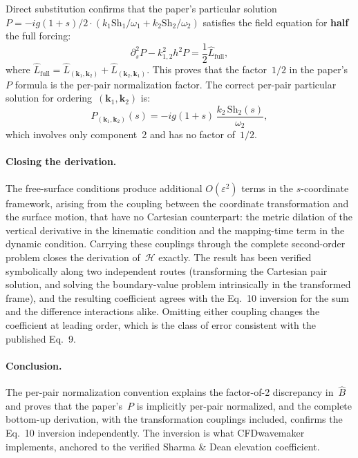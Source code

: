 \documentclass{ol-softwaremanual}
\begin{document}
Direct substitution confirms that the paper's particular solution $P = -ig(1+s)/2\cdot(k_1\mathrm{Sh}_1/\omega_1 + k_2\mathrm{Sh}_2/\omega_2)$ satisfies the field equation for \textbf{half} the full forcing:
\begin{equation}
\partial_s^2 P - k_{1,2}^2 h^2 P = \frac{1}{2}\hat{L}_\mathrm{full},
\end{equation}
where $\hat{L}_\mathrm{full} = \hat{L}_{(\mathbf{k}_1,\mathbf{k}_2)} + \hat{L}_{(\mathbf{k}_2,\mathbf{k}_1)}$. This proves that the factor~$1/2$ in the paper's~$P$ formula is the per-pair normalization factor. The correct per-pair particular solution for ordering~$(\mathbf{k}_1,\mathbf{k}_2)$ is:
\begin{equation}
P_{(\mathbf{k}_1,\mathbf{k}_2)}(s) = -ig(1+s)\,\frac{k_2\,\mathrm{Sh}_2(s)}{\omega_2},
\end{equation}
which involves only component~2 and has no factor of~$1/2$.

\paragraph{Closing the derivation.} The free-surface conditions produce additional $O(\varepsilon^2)$ terms in the $s$-coordinate framework, arising from the coupling between the coordinate transformation and the surface motion, that have no Cartesian counterpart: the metric dilation of the vertical derivative in the kinematic condition and the mapping-time term in the dynamic condition. Carrying these couplings through the complete second-order problem closes the derivation of~$\mathscr{H}$ exactly. The result has been verified symbolically along two independent routes (transforming the Cartesian pair solution, and solving the boundary-value problem intrinsically in the transformed frame), and the resulting coefficient agrees with the Eq.~10 inversion for the sum and the difference interactions alike. Omitting either coupling changes the coefficient at leading order, which is the class of error consistent with the published Eq.~9.

\paragraph{Conclusion.} The per-pair normalization convention explains the factor-of-2 discrepancy in~$\hat{B}$ and proves that the paper's~$P$ is implicitly per-pair normalized, and the complete bottom-up derivation, with the transformation couplings included, confirms the Eq.~10 inversion independently. The inversion is what CFDwavemaker implements, anchored to the verified Sharma \& Dean elevation coefficient.
\end{document}
